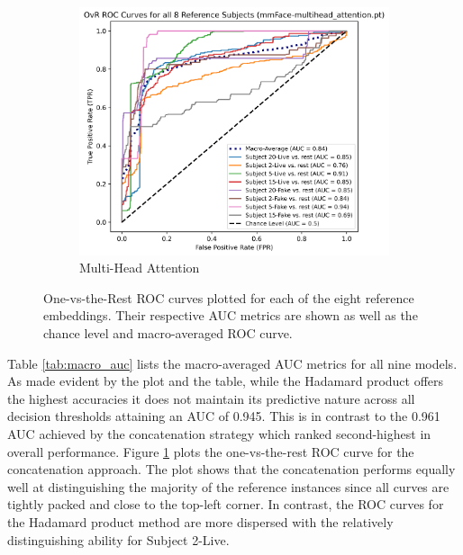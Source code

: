 \documentclass{mpaper}
\begin{document}
\begin{figure}[h!]
\begin{subfigure}[b]{0.3\textwidth}
        \label{fig:roc_concatenate}
    \end{subfigure}
    ~
    \begin{subfigure}[b]{0.31\textwidth}
        \includegraphics[width=\textwidth]{figures/roc_multihead_attention.png}
        \caption{Multi-Head Attention}
        \label{fig:roc_multihead_attention}
    \end{subfigure}
    \vspace{0.3cm}
    \caption{One-vs-the-Rest ROC curves plotted for each of the eight reference embeddings. Their respective AUC metrics are shown as well as the chance level and macro-averaged ROC curve.}
\end{figure}

Table \ref{tab:macro_auc} lists the macro-averaged AUC metrics for all nine models. As made evident by the plot and the table, while the Hadamard product offers the highest accuracies it does not maintain its predictive nature across all decision thresholds attaining an AUC of 0.945. This is in contrast to the 0.961 AUC achieved by the concatenation strategy which ranked second-highest in overall performance. Figure \ref{fig:roc_concatenate} plots the one-vs-the-rest ROC curve for the concatenation approach. The plot shows that the concatenation performs equally well at distinguishing the majority of the reference instances since all curves are tightly packed and close to the top-left corner. In contrast, the ROC curves for the Hadamard product method are more dispersed with the relatively distinguishing ability for Subject 2-Live.
\end{document}
